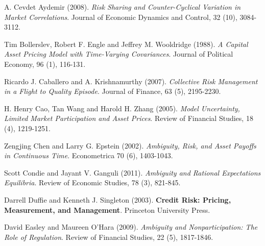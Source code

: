 \documentclass[10pt]{article}
\begin{document}
\begin{thebibliography}{99}

 A. Cevdet Aydemir (2008). {\it Risk Sharing and Counter-Cyclical Variation in Market Correlations}. Journal of Economic Dynamics and Control, 32 (10), 3084-3112.



 Tim Bollerslev, Robert F. Engle and Jeffrey M. Wooldridge (1988). {\it A Capital Asset Pricing Model with Time-Varying Covariances}. Journal of Political Economy, 96 (1), 116-131.

 Ricardo J. Caballero and A. Krishnamurthy (2007). {\it Collective Risk Management in a Flight to Quality Episode}. Journal of Finance, 63 (5), 2195-2230.



 H. Henry Cao, Tan Wang and Harold H. Zhang (2005). {\it Model Uncertainty, Limited Market Participation and Asset Prices}. Review of Financial Studies, 18 (4), 1219-1251.

 Zengjing Chen and Larry G. Epstein (2002). {\it Ambiguity, Risk, and Asset Payoffs in Continuous Time}. Econometrica 70 (6), 1403-1043.

 Scott Condie and Jayant V. Ganguli (2011). {\it Ambiguity and Rational Expectations Equilibria}. Review of Economic Studies, 78 (3), 821-845.


 Darrell Duffie and Kenneth J. Singleton (2003). {\bf Credit Risk: Pricing, Measurement, and Management}. Princeton University Press.

 David Easley and Maureen O'Hara (2009). {\it Ambiguity and Nonparticipation: The Role of Regulation}. Review of Financial Studies, 22 (5), 1817-1846.


\end{thebibliography}
\end{document}
